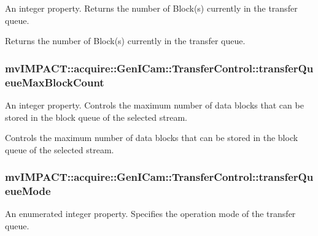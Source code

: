An integer property. Returns the number of Block(s) currently in the transfer queue. 

Returns the number of Block(s) currently in the transfer queue. \hypertarget{classmv_i_m_p_a_c_t_1_1acquire_1_1_gen_i_cam_1_1_transfer_control_a048b7b40ca8cc72206f93a902b7206a8}{
\subsubsection[{transfer\+Queue\+Max\+Block\+Count}]{ mv\+I\+M\+P\+A\+C\+T\+::acquire\+::\+Gen\+I\+Cam\+::\+Transfer\+Control\+::transfer\+Queue\+Max\+Block\+Count}}\label{classmv_i_m_p_a_c_t_1_1acquire_1_1_gen_i_cam_1_1_transfer_control_a048b7b40ca8cc72206f93a902b7206a8}


An integer property. Controls the maximum number of data blocks that can be stored in the block queue of the selected stream. 

Controls the maximum number of data blocks that can be stored in the block queue of the selected stream. \hypertarget{classmv_i_m_p_a_c_t_1_1acquire_1_1_gen_i_cam_1_1_transfer_control_a813d1478f6f76edce556c41ffc2e4898}{
\subsubsection[{transfer\+Queue\+Mode}]{ mv\+I\+M\+P\+A\+C\+T\+::acquire\+::\+Gen\+I\+Cam\+::\+Transfer\+Control\+::transfer\+Queue\+Mode}}\label{classmv_i_m_p_a_c_t_1_1acquire_1_1_gen_i_cam_1_1_transfer_control_a813d1478f6f76edce556c41ffc2e4898}


An enumerated integer property. Specifies the operation mode of the transfer queue. 


